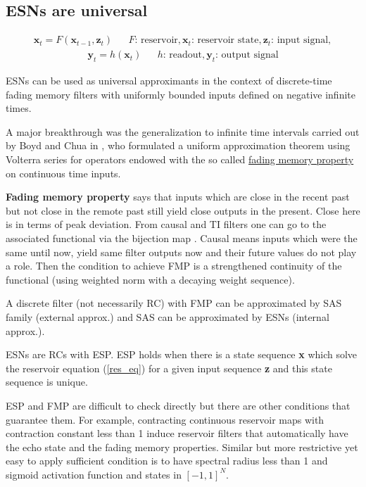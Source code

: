 \documentclass{article}
\begin{document}
\subsection{ESNs are universal \cite{ortega,grigoryeva2018universal}}

\begin{align} \label{res_eq}
    \textbf{x}_t = F(\textbf{x}_{t-1},\textbf{z}_{t}) && F \text{: reservoir}, \textbf{x}_t \text{: reservoir state},\textbf{z}_t \text{: input signal},
\end{align}
\begin{align}
    \textbf{y}_t = h(\textbf{x}_t) && h \text{: readout},\textbf{y}_t \text{: output signal}
\end{align}

ESNs can be used as universal approximants in the context of discrete-time fading memory filters with uniformly bounded inputs defined on negative infinite times. 

A major breakthrough was the generalization to infinite time intervals carried out by Boyd and Chua in \cite{fadingmem}, who formulated a uniform approximation theorem using Volterra series for operators endowed with the so called \underline{fading memory property} on continuous time inputs.

\textbf{Fading memory property} says that inputs which are close in the recent past but not close in the remote past still yield close outputs in the present. Close here is in terms of peak deviation. From causal and TI filters one can go to the associated functional via the bijection map \cite{fadingmem}. Causal means inputs which were the same until now, yield same filter outputs now and their future values do not play a role. Then the condition to achieve FMP is a strengthened continuity of the functional (using weighted norm with a decaying weight sequence).

A discrete filter (not necessarily RC) with FMP can be approximated by SAS family (external approx.) and SAS can be approximated by ESNs (internal approx.).

ESNs are RCs with ESP. ESP holds when there is a state sequence \textbf{x} which solve the reservoir equation (\ref{res_eq}) for a given input sequence \textbf{z} and this state sequence is unique. 

ESP and FMP are difficult to check directly but there are other conditions that guarantee them. For example, contracting continuous reservoir maps with contraction constant less than 1 induce reservoir filters that automatically have the echo state and the fading memory properties. Similar but more restrictive yet easy to apply sufficient condition is to have spectral radius less than 1 and sigmoid activation function and states in $[-1,1]^N$.
\end{document}
